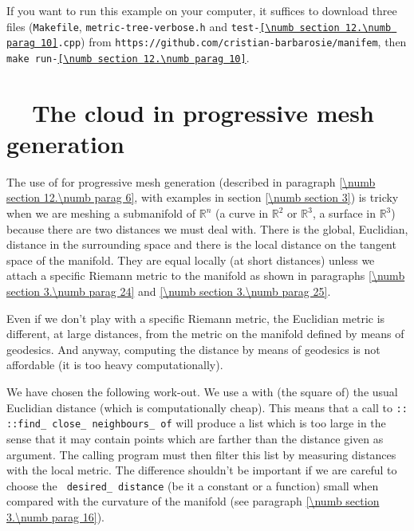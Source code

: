 If you want to run this example on your computer, it suffices to download three files
({\small\tt Makefile}, {\small\tt metric-tree-verbose.h} and
{\small\tt test-\ref{\numb section 12.\numb parag 10}.cpp}) from\hfil\break
{\small\tt https://github.com/cristian-barbarosie/manifem},\hfil\break
then {\small\tt make run-\ref{\numb section 12.\numb parag 10}}.


\section{~~The cloud in progressive mesh generation}\label{\numb section 12.\numb parag 11}

The use of {\small\tt{}} for progressive mesh generation (described in paragraph
\ref{\numb section 12.\numb parag 6}, with examples in section \ref{\numb section 3})
is tricky when we are meshing a submanifold of $ \mathbb{R}^n $
(a curve in $ \mathbb{R}^2 $ or $ \mathbb{R}^3 $, a surface in $ \mathbb{R}^3 $)
because there are two distances we must deal with.
There is the global, Euclidian, distance in the surrounding space
and there is the local distance on the tangent space of the manifold.
They are equal locally (at short distances) unless we attach a specific Riemann metric
to the manifold as shown in paragraphs \ref{\numb section 3.\numb parag 24} and
\ref{\numb section 3.\numb parag 25}.

Even if we don't play with a specific Riemann metric, the Euclidian metric is different,
at large distances, from the metric on the manifold defined by means of geodesics.
And anyway, computing the distance by means of geodesics is not affordable (it is too heavy
computationally).

We have chosen the following work-out.
We use a {\small\tt{}} with (the square of) the usual Euclidian distance
(which is computationally cheap).
This means that a call to {\small\tt{}:: ::find\_\,close\_\,neighbours\_\,of}
will produce a list which is too large in the sense that it may contain points which are
farther than the distance given as argument.
The calling program must then filter this list by measuring distances with the local metric.
The difference shouldn't be important if we are careful to choose the {\small\tt
desired\_\,distance} (be it a constant or a function) small when compared with the curvature
of the manifold (see paragraph \ref{\numb section 3.\numb parag 16}).

